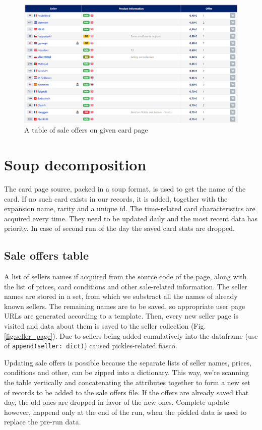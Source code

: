 \begin{figure}
      \centering
      \includegraphics[width=\textwidth]{figures/offers_table.png}
      \caption{A table of sale offers on given card page}
      \label{fig:offers_table}
\end{figure}

\section{Soup decomposition}
The card page source, packed in a soup format, is used to get the name of the card. If no such card exists in our records, it is added, together with the expansion name, rarity and a unique id. The time-related card characteristics are acquired every time. They need to be updated daily and the most recent data has priority. In case of second run of the day the saved card stats are dropped.

\subsection{Sale offers table}
A list of sellers names if acquired from the source code of the page, along with the list of prices, card conditions and other sale-related information. The seller names are stored in a set, from which we substract all the names of already known sellers. The remaining names are to be saved, so appropriate user page URLs are generated according to a template. Then, every new seller page is visited and data about them is saved to the seller collection (Fig. \ref{fig:seller_page}). Due to sellers being added cumulatively into the dataframe (use of \texttt{append(seller: dict)}) caused pickles-related fiasco. \par
Updating sale offers is possible because the separate lists of seller names, prices, conditions and other, can be zipped into a dictionary. This way, we're scanning the table vertically and concatenating the attributes together to form a new set of records to be added to the sale offers file. If the offers are already saved that day, the old ones are dropped in favor of the new ones. Complete update however, happend only at the end of the run, when the pickled data is used to replace the pre-run data.

